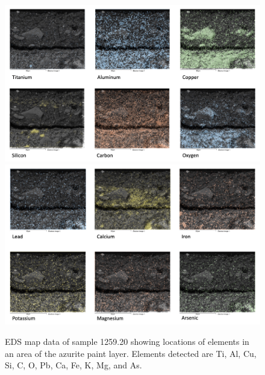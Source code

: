 \begin{figure}[H]
\centering
\begin{minipage}[t]{\linewidth}
  \centering
  \includegraphics[width=0.9\linewidth]{1259-20_mapdata_1}
\hfill
\includegraphics[width=0.9\linewidth]{1259-20_mapdata_2}
\hfill
\end{minipage}
\caption[EDS map data, sample 1259.20.]{EDS map data of sample 1259.20 showing locations of elements in an area of the azurite paint layer. Elements detected are Ti, Al, Cu, Si, C, O, Pb, Ca, Fe, K, Mg, and As.}
\label{fig:1259.20_mapdata}
\end{figure}

